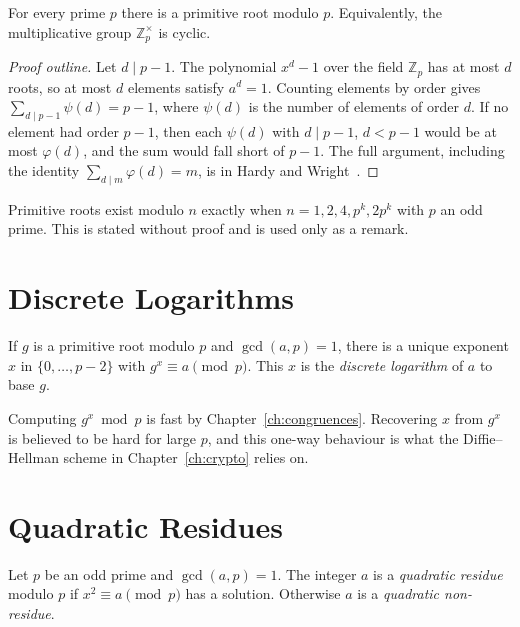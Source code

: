 \begin{theorem}\label{thm:prim-root-prime}
For every prime $p$ there is a primitive root modulo $p$. Equivalently, the multiplicative group $\mathbb{Z}_p^{\times}$ is cyclic.
\end{theorem}

\begin{proof}[Proof outline]
Let $d\mid p-1$. The polynomial $x^d-1$ over the field $\mathbb{Z}_p$ has at most $d$ roots, so at most $d$ elements satisfy $a^d=1$. Counting elements by order gives $\sum_{d\mid p-1}\psi(d)=p-1$, where $\psi(d)$ is the number of elements of order $d$. If no element had order $p-1$, then each $\psi(d)$ with $d\mid p-1$, $d<p-1$ would be at most $\varphi(d)$, and the sum would fall short of $p-1$. The full argument, including the identity $\sum_{d\mid m}\varphi(d)=m$, is in Hardy and Wright~\cite{hardy2008}.
\end{proof}

\begin{remark}
Primitive roots exist modulo $n$ exactly when $n=1,2,4,p^k,2p^k$ with $p$ an odd prime. This is stated without proof and is used only as a remark.
\end{remark}

\section{Discrete Logarithms}

If $g$ is a primitive root modulo $p$ and $\gcd(a,p)=1$, there is a unique exponent $x$ in $\{0,\dots,p-2\}$ with $g^x\equiv a\pmod p$. This $x$ is the \emph{discrete logarithm} of $a$ to base $g$.

Computing $g^x\bmod p$ is fast by Chapter~\ref{ch:congruences}. Recovering $x$ from $g^x$ is believed to be hard for large $p$, and this one-way behaviour is what the Diffie--Hellman scheme in Chapter~\ref{ch:crypto} relies on.

\section{Quadratic Residues}

\begin{definition}
Let $p$ be an odd prime and $\gcd(a,p)=1$. The integer $a$ is a \emph{quadratic residue} modulo $p$ if $x^2\equiv a\pmod p$ has a solution. Otherwise $a$ is a \emph{quadratic non-residue}.
\end{definition}

